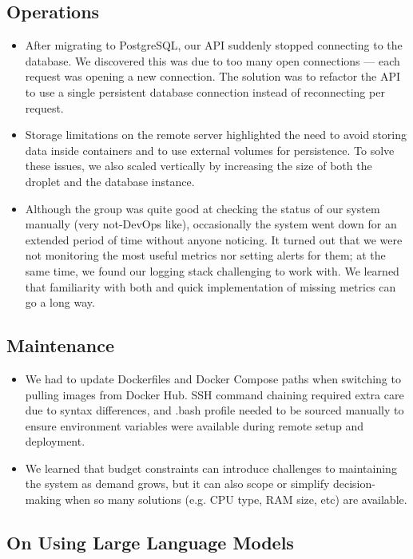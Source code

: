\subsection{Operations}
\begin{itemize}
    \item After migrating to PostgreSQL, our API suddenly stopped connecting to the database. We discovered this was due to too many open connections — each request was opening a new connection. The solution was to refactor the API to use a single persistent database connection instead of reconnecting per request.
    \item Storage limitations on the remote server highlighted the need to avoid storing data inside containers and to use external volumes for persistence. To solve these issues, we also scaled vertically by increasing the size of both the droplet and the database instance.
    \item Although the group was quite good at checking the status of our system manually (very not-DevOps like), occasionally the system went down for an extended period of time without anyone noticing. It turned out that we were not monitoring the most useful metrics nor setting alerts for them; at the same time, we found our logging stack challenging to work with. We learned that familiarity with both and quick implementation of missing metrics can go a long way.
\end{itemize}

\subsection{Maintenance}

\begin{itemize}
    \item We had to update Dockerfiles and Docker Compose paths when switching to pulling images from Docker Hub. SSH command chaining required extra care due to syntax differences, and .bash profile needed to be sourced manually to ensure environment variables were available during remote setup and deployment.
    \item We learned that budget constraints can introduce challenges to maintaining the system as demand grows, but it can also scope or simplify decision-making when so many solutions (e.g. CPU type, RAM size, etc) are available. 
\end{itemize}

\subsection{On Using Large Language Models}

